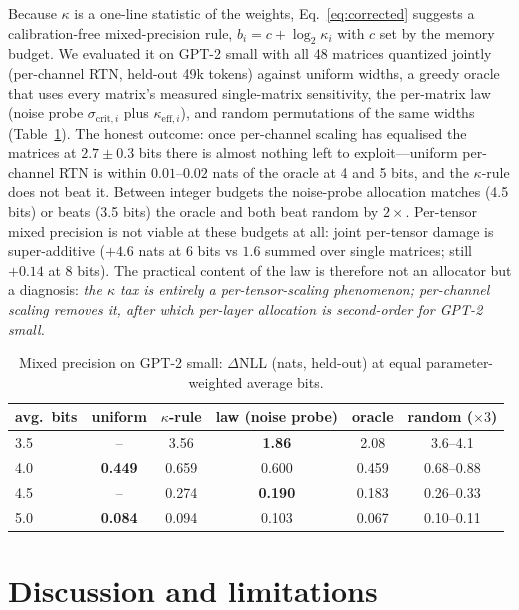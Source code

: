 \documentclass{article}
\begin{document}
Because $\kappa$ is a one-line statistic of the weights, Eq.~\eqref{eq:corrected} suggests a calibration-free
mixed-precision rule, $b_i = c + \log_2\kappa_i$ with $c$ set by the memory budget. We evaluated it on GPT-2 small with
all 48 matrices quantized jointly (per-channel RTN, held-out 49k tokens) against uniform widths, a greedy oracle that
uses every matrix's measured single-matrix sensitivity, the per-matrix law (noise probe $\sigma_{\mathrm{crit},i}$ plus
$\kappa_{\mathrm{eff},i}$), and random permutations of the same widths (Table~\ref{tab:mixed}). The honest outcome:
once per-channel scaling has equalised the matrices at $2.7\pm0.3$ bits there is almost nothing left to exploit---uniform
per-channel RTN is within $0.01$--$0.02$ nats of the oracle at 4 and 5 bits, and the $\kappa$-rule does not beat it. Between
integer budgets the noise-probe allocation matches (4.5 bits) or beats (3.5 bits) the oracle and both beat random by
$2\times$. Per-tensor mixed precision is not viable at these budgets at all: joint per-tensor damage is super-additive
($+4.6$ nats at 6 bits vs $1.6$ summed over single matrices; still $+0.14$ at 8 bits). The practical content of the law is
therefore not an allocator but a diagnosis: \emph{the $\kappa$ tax is entirely a per-tensor-scaling phenomenon; per-channel
scaling removes it, after which per-layer allocation is second-order for GPT-2 small.}
\begin{table}[t]
\centering\small
\caption{Mixed precision on GPT-2 small: $\Delta$NLL (nats, held-out) at equal parameter-weighted average bits.}
\label{tab:mixed}
\begin{tabular}{lccccc}
\toprule
avg.\ bits & uniform & $\kappa$-rule & law (noise probe) & oracle & random ($\times3$) \\
\midrule
3.5 & -- & 3.56 & \textbf{1.86} & 2.08 & 3.6--4.1 \\
4.0 & \textbf{0.449} & 0.659 & 0.600 & 0.459 & 0.68--0.88 \\
4.5 & -- & 0.274 & \textbf{0.190} & 0.183 & 0.26--0.33 \\
5.0 & \textbf{0.084} & 0.094 & 0.103 & 0.067 & 0.10--0.11 \\
\bottomrule
\end{tabular}
\end{table}



\section{Discussion and limitations}
\end{document}
